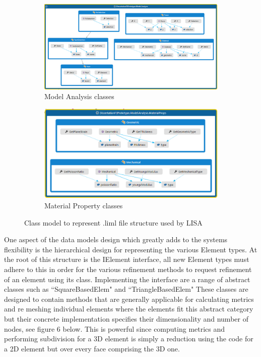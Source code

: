 \begin{figure}[H]
\centering
\begin{subfigure}{.5\textwidth}
  \centering
  \includegraphics[width=0.9\linewidth]{../Graphics/DataModelStructure/ModelAnalysis.png}
  \caption{Model Analysis classes}
  \label{fig:sub1}
\end{subfigure}%
\begin{subfigure}{.5\textwidth}
  \centering
  \includegraphics[width=0.9\linewidth]{../Graphics/DataModelStructure/MaterialProps.png}
  \caption{Material Property classes}
  \label{fig:sub2}
\end{subfigure}
\label{fig:test}
\caption{Class model to represent .liml file structure used by LISA}
\end{figure}






\noindent
One aspect of the data models design which greatly adds to the systems flexibility is the hierarchical design for representing the various Element types. At the root of this structure is the IElement interface, all new Element types must adhere to this in order for the various refinement methods to request refinement of an element using its class. Implementing the interface are a range of abstract classes such as ``SquareBasedElem" and ``TriangleBasedElem" These classes are designed to contain methods that are generally applicable for calculating metrics and re meshing individual elements where the elements fit this abstract category but their concrete implementation specifies their dimensionality and number of nodes, see figure 6 below. This is powerful since computing metrics and performing subdivision for a 3D element is simply a reduction using the code for a 2D element but over every face comprising the 3D one. \\ 


